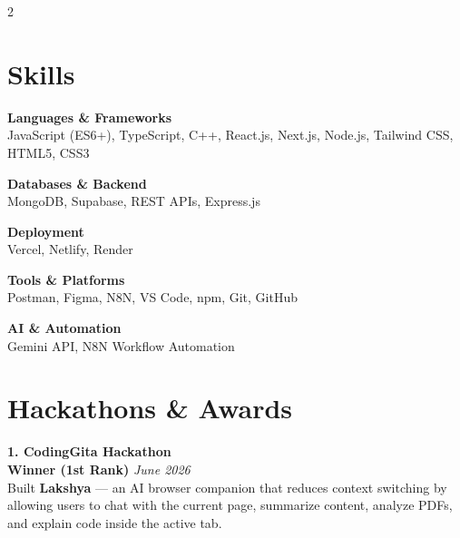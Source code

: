 \documentclass[letterpaper,10pt]{article}
\begin{document}
\setlength{\columnsep}{14pt}
\begin{paracol}{2}


\section{Skills}

\textbf{Languages \& Frameworks} \\
\small JavaScript (ES6+), TypeScript, C++, React.js, Next.js, Node.js, Tailwind CSS, HTML5, CSS3 \par

\vspace{5pt}
\textbf{Databases \& Backend} \\
\small MongoDB, Supabase, REST APIs, Express.js \par

\vspace{5pt}
\textbf{Deployment} \\
\small Vercel, Netlify, Render \par

\vspace{5pt}
\textbf{Tools \& Platforms} \\
\small Postman, Figma, N8N, VS Code, npm, Git, GitHub \par

\vspace{5pt}
\textbf{AI \& Automation} \\
\small Gemini API, N8N Workflow Automation \par

\vspace{6pt}

\section{Hackathons \& Awards}

\textbf{1. CodingGita Hackathon} \\
\small \textbf{Winner (1st Rank)} \hfill \textit{June 2026} \\
\small Built \textbf{Lakshya} — an AI browser companion that reduces context switching by allowing users to chat with the current page, summarize content, analyze PDFs, and explain code inside the active tab. \par


\end{paracol}
\end{document}
